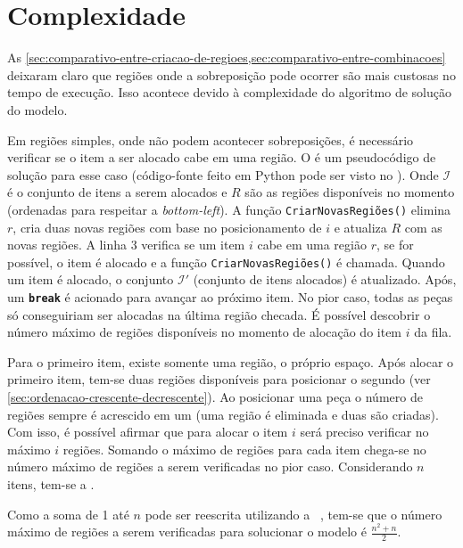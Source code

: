 \section{Complexidade}\label{sec:complexidade}

As \cref{sec:comparativo-entre-criacao-de-regioes,sec:comparativo-entre-combinacoes} deixaram claro
que regiões onde a sobreposição pode ocorrer são mais custosas no tempo de execução.
Isso acontece devido à complexidade do algoritmo de solução do modelo.

Em regiões simples, onde não podem acontecer sobreposições, é necessário verificar se o item a ser
alocado cabe em uma região.
O  é um pseudocódigo de solução para esse caso (código-fonte feito em
Python pode ser visto no ).
Onde $\mathcal{I}$ é o conjunto de itens a serem alocados e $R$ são as regiões disponíveis no
momento (ordenadas para respeitar a \textit{bottom-left}).
A função \texttt{CriarNovasRegiões()} elimina $r$, cria duas novas regiões com base no
posicionamento de $i$ e atualiza $R$ com as novas regiões.
A linha 3 verifica se um item $i$ cabe em uma região $r$, se for possível, o item é alocado e a
função \texttt{CriarNovasRegiões()} é chamada.
Quando um item é alocado, o conjunto $\mathcal{I'}$ (conjunto de itens alocados) é atualizado.
Após, um \texttt{\textbf{break}} é acionado para avançar ao próximo item.
No pior caso, todas as peças só conseguiriam ser alocadas na última região checada.
É possível descobrir o número máximo de regiões disponíveis no momento de alocação do item $i$ da
fila.



Para o primeiro item, existe somente uma região, o próprio espaço.
Após alocar o primeiro item, tem-se duas regiões disponíveis para posicionar o segundo (ver
\cref{sec:ordenacao-crescente-decrescente}).
Ao posicionar uma peça o número de regiões sempre é acrescido em um (uma região é eliminada e duas
são criadas).
Com isso, é possível afirmar que para alocar o item $i$ será preciso verificar no máximo $i$ regiões.
Somando o máximo de regiões para cada item chega-se no número máximo de regiões a serem verificadas
no pior caso.
Considerando $n$ itens, tem-se a .



Como a soma de 1 até $n$ pode ser reescrita utilizando a 
~\cite{merca2015alternative}, tem-se que o número máximo de regiões a serem verificadas
para solucionar o modelo é $\frac{n^2 + n}{2}$.

